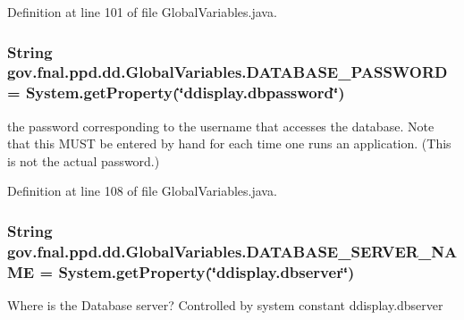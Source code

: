Definition at line 101 of file Global\-Variables.\-java.

\hypertarget{classgov_1_1fnal_1_1ppd_1_1dd_1_1GlobalVariables_ae63bd973c9c02683b0c4964179ceefe0}{
\subsubsection[{D\-A\-T\-A\-B\-A\-S\-E\-\_\-\-P\-A\-S\-S\-W\-O\-R\-D}]{\setlength{\rightskip}{0pt plus 5cm}String gov.\-fnal.\-ppd.\-dd.\-Global\-Variables.\-D\-A\-T\-A\-B\-A\-S\-E\-\_\-\-P\-A\-S\-S\-W\-O\-R\-D = System.\-get\-Property(\char`\"{}ddisplay.\-dbpassword\char`\"{})\hspace{0.3cm}{\ttfamily [static]}}}\label{classgov_1_1fnal_1_1ppd_1_1dd_1_1GlobalVariables_ae63bd973c9c02683b0c4964179ceefe0}
the password corresponding to the username that accesses the database. Note that this M\-U\-S\-T be entered by hand for each time one runs an application. (This is not the actual password.) 

Definition at line 108 of file Global\-Variables.\-java.

\hypertarget{classgov_1_1fnal_1_1ppd_1_1dd_1_1GlobalVariables_a84bb07dcee9c961579282f50a5031c0e}{
\subsubsection[{D\-A\-T\-A\-B\-A\-S\-E\-\_\-\-S\-E\-R\-V\-E\-R\-\_\-\-N\-A\-M\-E}]{\setlength{\rightskip}{0pt plus 5cm}String gov.\-fnal.\-ppd.\-dd.\-Global\-Variables.\-D\-A\-T\-A\-B\-A\-S\-E\-\_\-\-S\-E\-R\-V\-E\-R\-\_\-\-N\-A\-M\-E = System.\-get\-Property(\char`\"{}ddisplay.\-dbserver\char`\"{})\hspace{0.3cm}{\ttfamily [static]}}}\label{classgov_1_1fnal_1_1ppd_1_1dd_1_1GlobalVariables_a84bb07dcee9c961579282f50a5031c0e}
Where is the Database server? Controlled by system constant ddisplay.\-dbserver 

